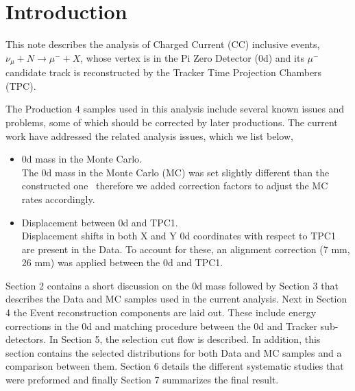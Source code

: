 \section{Introduction}
\label{sec:Introduction}

This note describes the analysis of Charged Current (CC) 
inclusive events, $\nu_\mu + N \rightarrow \mu^- + X $, 
whose vertex is in the Pi Zero Detector (\p0d) and
its $\mu^-$ candidate track is reconstructed 
by the Tracker Time Projection Chambers (TPC). 

The Production 4 samples used in this analysis 
include several known issues and problems, 
some of which should be corrected by later productions.
The current work %
have addressed the related analysis issues, 
which we list below,

\begin{itemize}

\item \p0d mass in the Monte Carlo. \\
The \p0d mass in the Monte Carlo (MC) was set slightly different than the 
constructed one~\cite{tn73}  
therefore we added correction factors to adjust the MC rates accordingly. 

\item Displacement between \p0d and TPC1. \\
Displacement shifts in both X and Y \p0d coordinates with respect 
to TPC1 are present in the Data. 
To account for these, 
an alignment correction (7 mm, 26 mm) was applied between the \p0d 
and TPC1.  

\end{itemize}

Section 2 contains a short discussion on the \p0d mass followed 
by Section 3 that describes the Data and MC samples used 
in the current analysis. 
Next in Section 4 the Event reconstruction components are 
laid out. These include energy corrections in the \p0d 
and matching procedure between the \p0d and Tracker sub-detectors.
In Section 5, the selection cut flow is described. 
In addition, this section contains the selected 
distributions for both Data and MC samples and a comparison between them.
Section 6 details the different systematic studies that were 
preformed and finally Section 7 summarizes the final result.


